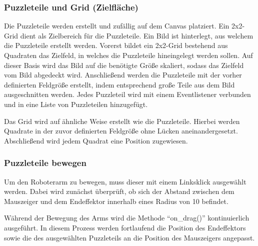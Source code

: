 \documentclass[12pt]{article}
\begin{document}
    

    \subsubsection{Puzzleteile und Grid (Zielfläche)}
    Die Puzzleteile werden erstellt und zufällig auf dem Canvas platziert. Ein 2x2-Grid dient als
    Zielbereich für die Puzzleteile. Ein Bild ist hinterlegt, aus welchem die Puzzleteile erstellt werden.
    Vorerst bildet ein 2x2-Grid bestehend aus Quadraten das Zielfeld, in welches die Puzzleteile
    hineingelegt werden sollen. Auf dieser Basis wird das Bild auf die benötigte Größe skaliert, sodass
    das Zielfeld vom Bild abgedeckt wird. Anschließend werden die Puzzleteile mit der vorher definierten
    Feldgröße erstellt, indem entsprechend große Teile aus dem Bild ausgeschnitten werden. Jedes
    Puzzleteil wird mit einem Eventlistener verbunden und in eine Liste von Puzzleteilen hinzugefügt.

    


    Das Grid wird auf ähnliche Weise erstellt wie die Puzzleteile. Hierbei werden Quadrate in der zuvor
    definierten Feldgröße ohne Lücken aneinandergesetzt. Abschließend wird jedem Quadrat eine Position
    zugewiesen.

    

    \subsubsection{Puzzleteile bewegen}
    Um den Roboterarm zu bewegen, muss dieser mit einem Linksklick ausgewählt werden. Dabei wird zunächst
    überprüft, ob sich der Abstand zwischen dem Mauszeiger und dem Endeffektor innerhalb eines Radius
    von 10 befindet.

    
    

    Während der Bewegung des Arms wird die Methode “on\_drag()” kontinuierlich ausgeführt. In diesem
    Prozess werden fortlaufend die Position des Endeffektors sowie die des ausgewählten Puzzleteils an
    die Position des Mauszeigers angepasst.

    
\end{document}
